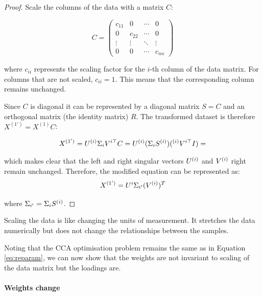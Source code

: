 \begin{proof}
    Scale the columns of the data with a matrix \( C \):

    \begin{equation}
        C = \begin{pmatrix}
                c_{11} & 0      & \cdots & 0      \\
                0      & c_{22} & \cdots & 0      \\
                \vdots & \vdots & \ddots & \vdots \\
                0      & 0      & \cdots & c_{nn}
        \end{pmatrix}
    \end{equation}

    where \( c_{ii} \) represents the scaling factor for the \( i \)-th column of the data matrix. For columns that are not scaled, \( c_{ii} = 1 \).
    This means that the corresponding column remains unchanged.

    Since $C$ is diagonal it can be represented by a diagonal matrix $S=C$ and an orthogonal matrix (the identity matrix) $R$.
    The transformed dataset is therefore \( X^{(1')} = X^{(1)}C \):

    \begin{align}
        X^{(1')} = U^{(i)}\Sigma_{i}V^{i\top}C = U^{(i)}(\Sigma_{i} S^{(i)}) (^{(i)}V^{i\top}I) =  \label{eq:scaled_data}
    \end{align}

    which makes clear that the left and right singular vectors \( U^{(i)} \) and \( V^{(i)} \) right remain unchanged.
    Therefore, the modified equation can be represented as:
    \begin{equation}
        X^{(1')} = U^i \Sigma_{i'} (V^{(i)})^T \label{eq:modified_svd}
    \end{equation}

    where $\Sigma_{i'}=\Sigma_{i} S^{(i)}$.
\end{proof}

Scaling the data is like changing the units of measurement.
It stretches the data numerically but does not change the relationships between the samples.

Noting that the CCA optimisation problem remains the same as in Equation \ref{eq:reparam},
we can now show that the weights are not invariant to scaling of the data matrix but the \gls{loadings} are.

\paragraph{Weights change}

